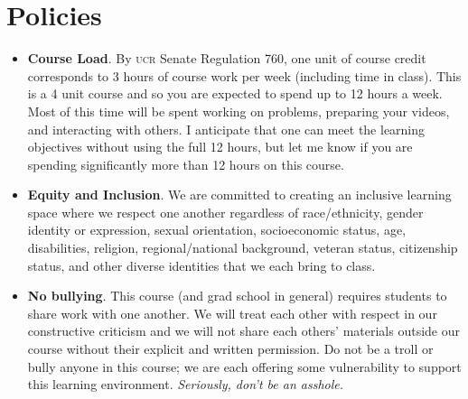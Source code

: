 \documentclass[12pt]{article}
\numberwithin{equation}{section}    %
\begin{document}
\section*{Policies}

\begin{itemize}
	\item \textbf{Course Load}. By \textsc{ucr} Senate Regulation 760, one unit of course credit corresponds to 3 hours of course work per week (including time in class). This is a 4 unit course and so you are expected to spend up to 12 hours a week. Most of this time will be spent working on problems, preparing your videos, and interacting with others. I anticipate that one can meet the learning objectives without using the full 12 hours, but let me know if you are spending significantly more than 12 hours on this course.
	\item \textbf{Equity and Inclusion}. We are committed to creating an inclusive learning space where we respect one another regardless of race/ethnicity, gender identity or expression, sexual orientation, socioeconomic status, age, disabilities, religion, regional/national background, veteran status, citizenship status, and other diverse identities that we each bring to class.
	\item \textbf{No bullying}. This course (and grad school in general) requires students to share work with one another. We will treat each other with respect in our constructive criticism and we will not share each others' materials outside our course without their explicit and written permission. Do not be a troll or bully anyone in this course; we are each offering some vulnerability to support this learning environment.  \emph{Seriously, don't be an asshole.}

\end{itemize}
\end{document}
